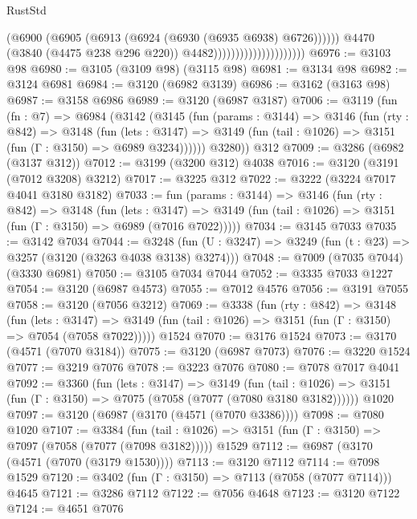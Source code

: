 \begin{lexlean}{RustStd}
\begin{coremodule}
                                                (@6900
                                                  (@6905
                                                    (@6913 (@6924 (@6930 (@6935 @6938) @6726))))))
                                              @4470
                                              (@3840 (@4475 @238 @296 @220))
                                              @4482)))))))))))))))))))))
@6976 := @3103 @98
@6980 := @3105 (@3109 @98) (@3115 @98)
@6981 := @3134 @98
@6982 := @3124 @6981
@6984 := @3120 (@6982 @3139)
@6986 := @3162 (@3163 @98)
@6987 := @3158 @6986
@6989 := @3120 (@6987 @3187)
@7006 := @3119
    (fun (fn : @7) =>
    @6984
      (@3142
        (@3145
          (fun (params : @3144) =>
          @3146
            (fun (rty : @842) =>
            @3148
              (fun (lets : @3147) =>
              @3149 (fun (tail : @1026) => @3151 (fun (Γ : @3150) => @6989 @3234))))))
        @3280))
    @312
@7009 := @3286 (@6982 (@3137 @312))
@7012 := @3199 (@3200 @312) @4038
@7016 := @3120 (@3191 (@7012 @3208) @3212)
@7017 := @3225 @312
@7022 := @3222 (@3224 @7017 @4041 @3180 @3182)
@7033 := fun (params : @3144) =>
  @3146
    (fun (rty : @842) =>
    @3148
      (fun (lets : @3147) =>
      @3149 (fun (tail : @1026) => @3151 (fun (Γ : @3150) => @6989 (@7016 @7022)))))
@7034 := @3145 @7033
@7035 := @3142 @7034
@7044 := @3248 (fun (U : @3247) => @3249 (fun (t : @23) => @3257 (@3120 (@3263 @4038 @3138) @3274)))
@7048 := @7009 (@7035 @7044) (@3330 @6981)
@7050 := @3105 @7034 @7044
@7052 := @3335 @7033 @1227
@7054 := @3120 (@6987 @4573)
@7055 := @7012 @4576
@7056 := @3191 @7055
@7058 := @3120 (@7056 @3212)
@7069 := @3338
    (fun (rty : @842) =>
    @3148
      (fun (lets : @3147) =>
      @3149 (fun (tail : @1026) => @3151 (fun (Γ : @3150) => @7054 (@7058 @7022)))))
    @1524
@7070 := @3176 @1524
@7073 := @3170 (@4571 (@7070 @3184))
@7075 := @3120 (@6987 @7073)
@7076 := @3220 @1524
@7077 := @3219 @7076
@7078 := @3223 @7076
@7080 := @7078 @7017 @4041
@7092 := @3360
    (fun (lets : @3147) =>
    @3149
      (fun (tail : @1026) => @3151 (fun (Γ : @3150) => @7075 (@7058 (@7077 (@7080 @3180 @3182))))))
    @1020
@7097 := @3120 (@6987 (@3170 (@4571 (@7070 @3386))))
@7098 := @7080 @1020
@7107 := @3384
    (fun (tail : @1026) => @3151 (fun (Γ : @3150) => @7097 (@7058 (@7077 (@7098 @3182)))))
    @1529
@7112 := @6987 (@3170 (@4571 (@7070 (@3179 @1530))))
@7113 := @3120 @7112
@7114 := @7098 @1529
@7120 := @3402 (fun (Γ : @3150) => @7113 (@7058 (@7077 @7114))) @4645
@7121 := @3286 @7112
@7122 := @7056 @4648
@7123 := @3120 @7122
@7124 := @4651 @7076

\end{coremodule}
\end{lexlean}
